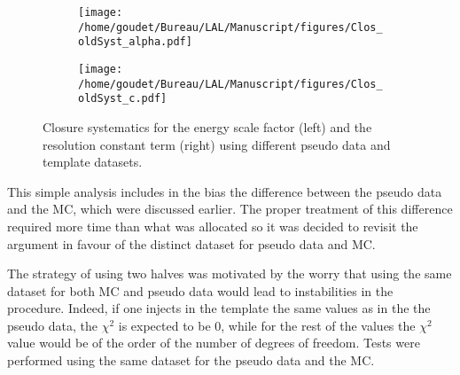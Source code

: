 \begin{enumerate}
\begin{figure}
\begin{subfigure}[t]{0.49\linewidth}
\begin{center}
\texttt{[image: /home/goudet/Bureau/LAL/Manuscript/figures/Clos\_oldSyst\_alpha.pdf]}
\end{center}
\end{subfigure}
\begin{subfigure}[t]{0.49\linewidth}
\begin{center}
\texttt{[image: /home/goudet/Bureau/LAL/Manuscript/figures/Clos\_oldSyst\_c.pdf]}
\end{center}
\end{subfigure}
\caption{\label{org3b08331}
Closure systematics for the energy scale factor (left) and the resolution constant  term (right) using different pseudo data and template datasets. \cite{Guerguichon_170420}}
\end{figure}


This simple analysis includes in the bias the difference between the pseudo data and the MC, which were discussed earlier.
The proper treatment of this difference required more time than what was allocated so it was decided to revisit the argument in favour of the distinct dataset for pseudo data and MC.

The strategy of using two halves was motivated by the worry that using the same dataset for both MC and pseudo data would lead to instabilities in the procedure.
Indeed, if one injects in the template the same values as in the the pseudo data, the $\chi^2$ is expected to be 0, while for the rest of the values the $\chi^2$ value would be of the order of the number of degrees of freedom.
Tests were performed using the same dataset for the pseudo data and the MC.


\end{enumerate}

